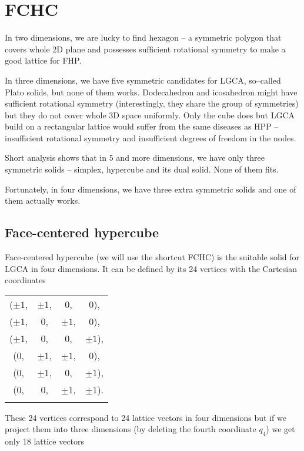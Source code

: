 \chapter{FCHC}

In two dimensions, we are lucky to find hexagon -- a symmetric polygon that covers whole 2D plane and possesses sufficient rotational symmetry to make a good lattice for FHP.

In three dimensions, we have five symmetric candidates for LGCA, so--called Plato solids, but none of them works.
Dodecahedron and icosahedron might have sufficient rotational symmetry (interestingly, they share the group of symmetries)
but they do not cover whole 3D space uniformly. Only the cube does but LGCA build on a rectangular lattice would suffer from the same diseases as HPP -- insufficient rotational symmetry and insufficient degrees of freedom in the nodes.

Short analysis \cite{wolf} shows that in 5 and more dimensions, we have only three symmetric solids -- simplex, hypercube and its dual solid. None of them fits.

\bigskip

Fortunately, in four dimensions, we have three extra symmetric solids and one of them actually works.

\section{Face-centered hypercube}
Face-centered hypercube (we will use the shortcut FCHC) is the suitable solid for LGCA in four dimensions. It can be defined by its 24 vertices with the Cartesian coordinates

\begin{tabular}{cccc}
\\
($\pm 1$,& $\pm 1$,& $0$,& $0$),\\
($\pm 1$,& $0$,& $\pm 1$,& $0$),\\
($\pm 1$,& $0$,& $0$,& $\pm 1$),\\
($0$,& $\pm 1$,& $\pm 1$,& $0$),\\
($0$,& $\pm 1$,& $0$,& $\pm 1$),\\
($0$,& $0$,& $\pm 1$,& $\pm 1$).\\
\\
\end{tabular}

These 24 vertices correspond to 24 lattice vectors in four dimensions but if we project them into three dimensions (by deleting the fourth coordinate $q_4$) we get only 18 lattice vectors

